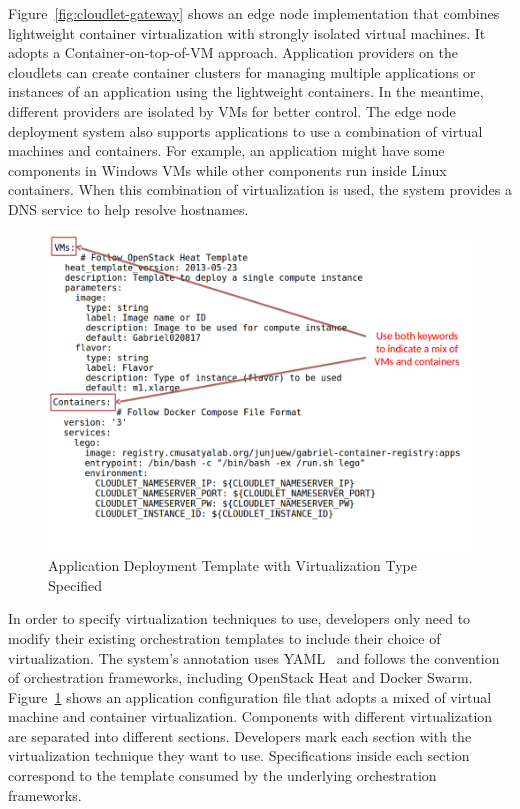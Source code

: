 Figure~\ref{fig:cloudlet-gateway} shows an edge node implementation that
combines lightweight container virtualization with strongly isolated virtual
machines. It adopts a Container-on-top-of-VM approach. Application providers on
the cloudlets can create container clusters for managing multiple applications
or instances of an application using the lightweight containers. In the
meantime, different providers are isolated by VMs for better control. The edge
node deployment system also supports applications to use a combination of
virtual machines and containers. For example, an application might have some
components in Windows VMs while other components run inside Linux containers.
When this combination of virtualization is used, the system provides a DNS
service to help resolve hostnames.

\begin{figure}[h]
  \centering
  \includegraphics[trim={0 1.5in 0 0},clip,width=5in]{FIGS/cloudlet-app-configuration}
  \caption{Application Deployment Template with Virtualization Type Specified}
  \label{fig:cloudlet-app-configuration}
  \end{figure}


In order to specify virtualization techniques to use, developers only need to
modify their existing orchestration templates to include their choice of
virtualization. The system's annotation uses YAML~\cite{ben2005yaml} and follows
the convention of orchestration frameworks, including OpenStack Heat and Docker
Swarm. Figure~\ref{fig:cloudlet-app-configuration} shows an application
configuration file that adopts a mixed of virtual machine and container
virtualization. Components with different virtualization are separated into
different sections. Developers mark each section with the virtualization
technique they want to use. Specifications inside each section correspond to the
template consumed by the underlying orchestration frameworks.
